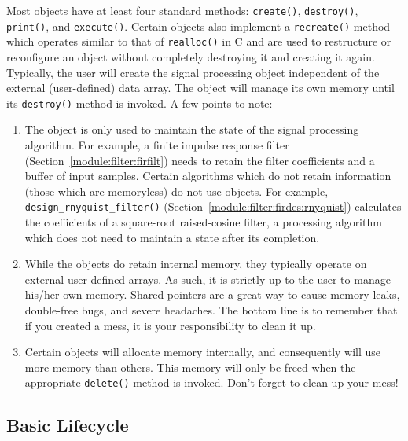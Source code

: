 Most objects have at least four standard methods:
{\tt create()},
{\tt destroy()},
{\tt print()},
and
{\tt execute()}.
Certain objects also implement a {\tt recreate()} method which operates
similar to that of {\tt realloc()} in C and are used to restructure or
reconfigure an object without completely destroying it and creating it again.
Typically, the user will create the signal processing object independent of
the external (user-defined) data array.
The object will manage its own memory until its {\tt destroy()} method is
invoked.
A few points to note:
\begin{enumerate}
\item The object is only used to maintain the state of the signal processing
      algorithm.
      For example, a finite impulse response filter
      (Section~\ref{module:filter:firfilt}) needs to retain the filter
      coefficients and a buffer of input samples.
      Certain algorithms which do not retain information (those which are
      memoryless) do not use objects.
      For example, {\tt design\_rnyquist\_filter()}
      (Section~\ref{module:filter:firdes:rnyquist})
      calculates the coefficients of a square-root raised-cosine filter,
      a processing algorithm which does not need to maintain a state
      after its completion.
\item While the objects do retain internal memory, they typically operate on
      external user-defined arrays.
      As such, it is strictly up to the user to manage his/her own
      memory.
      Shared pointers are a great way to cause memory leaks, double-free
      bugs, and severe headaches.
      The bottom line is to remember that if you created a mess, it is
      your responsibility to clean it up.
\item Certain objects will allocate memory internally, and consequently
      will use more memory than others.
      This memory will only be freed when the appropriate {\tt delete()}
      method is invoked.
      Don't forget to clean up your mess!
\end{enumerate}


\subsection{Basic Lifecycle}
\label{section:data_structures:lifecycle}


